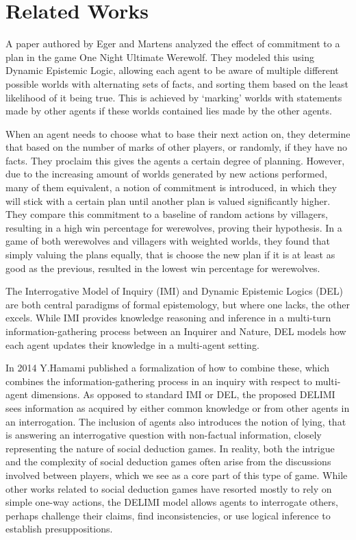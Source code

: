\section{Related Works}
A paper authored by Eger and Martens\cite{commitment} analyzed the effect of
commitment to a plan in the game One Night Ultimate Werewolf. They modeled this
using Dynamic Epistemic Logic, allowing each agent to be aware of multiple
different possible worlds with alternating sets of facts, and sorting them
based on the least likelihood of it being true. This is achieved by ‘marking’
worlds with statements made by other agents if these worlds contained lies made
by the other agents.

When an agent needs to choose what to base their next action on, they determine
that based on the number of marks of other players, or randomly, if they have
no facts. They proclaim this gives the agents a certain degree of planning.
However, due to the increasing amount of worlds generated by new actions
performed, many of them equivalent, a notion of commitment is introduced, in
which they will stick with a certain plan until another plan is valued
significantly higher. They compare this commitment to a baseline of random
actions by villagers, resulting in a high win percentage for werewolves,
proving their hypothesis. In a game of both werewolves and villagers with
weighted worlds, they found that simply valuing the plans equally, that is
choose the new plan if it is at least as good as the previous, resulted in the
lowest win percentage for werewolves.

The Interrogative Model of Inquiry (IMI) and Dynamic Epistemic Logics (DEL) are
both central paradigms of formal epistemology, but where one lacks, the other
excels. While IMI provides knowledge reasoning and inference in a multi-turn
information-gathering process between an Inquirer and Nature, DEL models how
each agent updates their knowledge in a multi-agent setting.

In 2014 Y.Hamami\cite{delimi} published a formalization of how to combine
these, which combines the information-gathering process in an inquiry with
respect to multi-agent dimensions. As opposed to standard IMI or DEL, the
proposed DELIMI sees information as acquired by either common knowledge or from
other agents in an interrogation. The inclusion of agents also introduces the
notion of lying, that is answering an interrogative question with non-factual
information, closely representing the nature of social deduction games. In
reality, both the intrigue and the complexity of social deduction games often
arise from the discussions involved between players, which we see as a core
part of this type of game. While other works related to social deduction games
have resorted mostly to rely on simple one-way actions, the DELIMI model allows
agents to interrogate others, perhaps challenge their claims, find
inconsistencies, or use logical inference to establish presuppositions.


